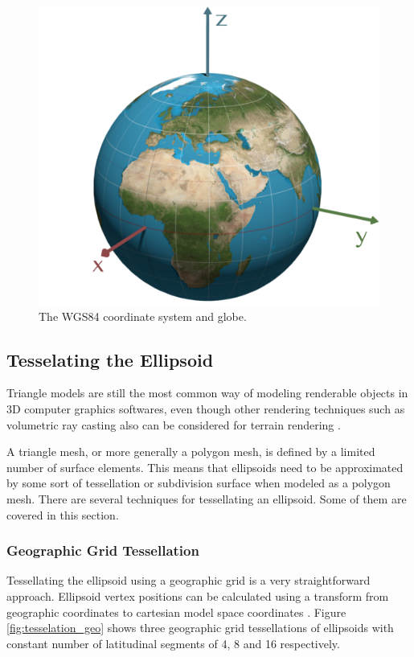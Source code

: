 \begin{figure}
\centering
\includegraphics[scale=0.25]{figures/wgs84.pdf}
\caption{The WGS84 coordinate system and globe.}
\label{fig:wgs84}
\end{figure}

\subsection{Tesselating the Ellipsoid}

Triangle models are still the most common way of modeling renderable objects in 3D computer graphics softwares, even though other rendering techniques such as volumetric ray casting also can be considered for terrain rendering \cite[p. 149]{cozzi11}.

A triangle mesh, or more generally a polygon mesh, is defined by a limited number of surface elements. This means that ellipsoids need to be approximated by some sort of tessellation or subdivision surface when modeled as a polygon mesh. There are several techniques for tessellating an ellipsoid. Some of them are covered in this section.

\subsubsection{Geographic Grid Tessellation}
\label{sec:geogrid}
Tessellating the ellipsoid using a geographic grid is a very straightforward approach. Ellipsoid vertex positions can be calculated using a transform from geographic coordinates to cartesian model space coordinates \cite[p. 25]{cozzi11}. Figure \ref{fig:tesselation_geo} shows three geographic grid tessellations of ellipsoids with constant number of latitudinal segments of 4, 8 and 16 respectively.

